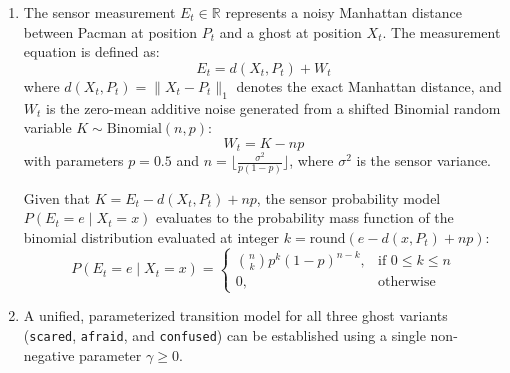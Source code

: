 \documentclass{article}
\begin{document}
\begin{enumerate}[label=\alph*.,leftmargin=*]
    \item 
    The sensor measurement $E_t \in \mathbb{R}$ represents a noisy Manhattan distance between Pacman at position $P_t$ and a ghost at position $X_t$. The measurement equation is defined as:
    \begin{equation}
    E_t = d(X_t, P_t) + W_t
    \end{equation}
    where $d(X_t, P_t) = \|X_t - P_t\|_1$ denotes the exact Manhattan distance, and $W_t$ is the zero-mean additive noise generated from a shifted Binomial random variable $K \sim \text{Binomial}(n, p)$:
    \begin{equation}
    W_t = K - np
    \end{equation}
    with parameters $p = 0.5$ and $n = \lfloor \frac{\sigma^2}{p(1-p)} \rfloor$, where $\sigma^2$ is the sensor variance.
    
    Given that $K = E_t - d(X_t, P_t) + np$, the sensor probability model $P(E_t = e \mid X_t = x)$ evaluates to the probability mass function of the binomial distribution evaluated at integer $k = \text{round}(e - d(x, P_t) + np)$:
    \begin{equation}
    P(E_t = e \mid X_t = x) = \begin{cases} 
    \binom{n}{k} p^k (1-p)^{n-k}, & \text{if } 0 \le k \le n \\ 
    0, & \text{otherwise} 
    \end{cases}
    \end{equation}

    \item 
    A unified, parameterized transition model for all three ghost variants (\texttt{scared}, \texttt{afraid}, and \texttt{confused}) can be established using a single non-negative parameter $\gamma \ge 0$.
    

\end{enumerate}
\end{document}
